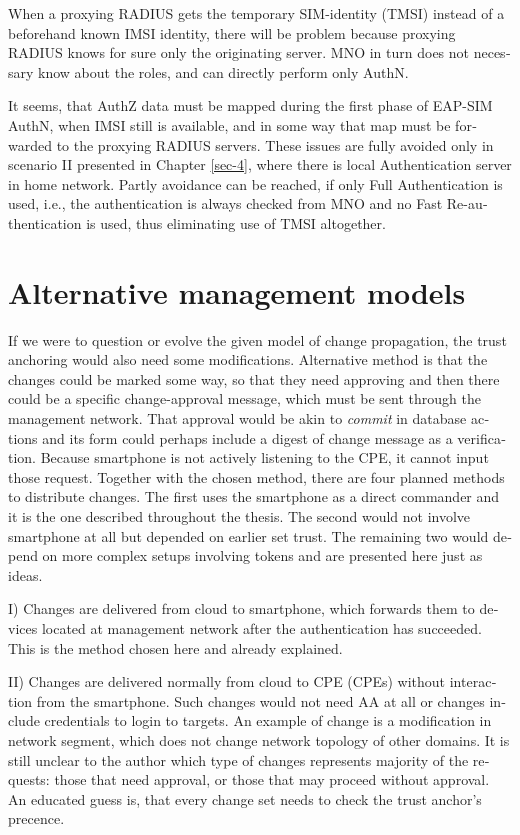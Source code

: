 \documentclass[12pt,a4paper,english]{tutthesis}
\begin{document}
\begin{otherlanguage}{english}
When a proxying RADIUS gets the temporary SIM-identity (TMSI) instead
of a beforehand known IMSI identity, there will be problem
because proxying RADIUS knows for sure only the originating server. 
MNO in turn does not necessary know about the roles, and can directly
perform only AuthN.

It seems, that AuthZ data must be mapped during the first phase of
EAP-SIM AuthN, when IMSI still is available, and in some way
that map must be forwarded to the proxying RADIUS servers.
These issues are fully avoided only in scenario II presented in Chapter
\ref{sec-4}, where there is local Authentication server in home network.
Partly avoidance can be reached, if only Full Authentication is
used, i.e., the authentication is always checked from MNO and no Fast
Re-authentication is used, thus eliminating use of TMSI altogether.





\section{Alternative management models}
\label{sec-6-6}

If we were to question or evolve the given model of change
propagation, the trust anchoring would also need some modifications.
Alternative method is that the changes could be marked some way, so
that they need approving and then there could be a specific
change-approval message, which must be sent through the management
network. That approval would be akin to \emph{commit} in database actions
and its form could perhaps include a digest of change message as a verification.
Because smartphone is not actively listening to the CPE, it cannot input
those request. Together with the chosen method, there are four planned
methods to distribute changes. The first uses the smartphone as a
direct commander and it is the one described throughout the thesis.
The second would not involve smartphone at all but depended on
earlier set trust. The remaining two would depend on more complex
setups involving tokens and are presented here just as ideas.


I) Changes are delivered from cloud to smartphone, which forwards them
   to devices located at management network after the
   authentication has succeeded. This is the method chosen here and
   already explained.

II) Changes are delivered normally from cloud to CPE (CPEs) without
   interaction from the smartphone. Such changes would not need AA at
   all or changes include credentials to login to targets. An example
   of change is a modification in network segment, which does not
   change network topology of other domains.  It is still unclear to
   the author which type of changes represents majority of the
   requests: those that need approval, or those that may proceed
   without approval. An educated guess is, that every change set needs
   to check the trust anchor's precence.




\end{otherlanguage}
\end{document}
